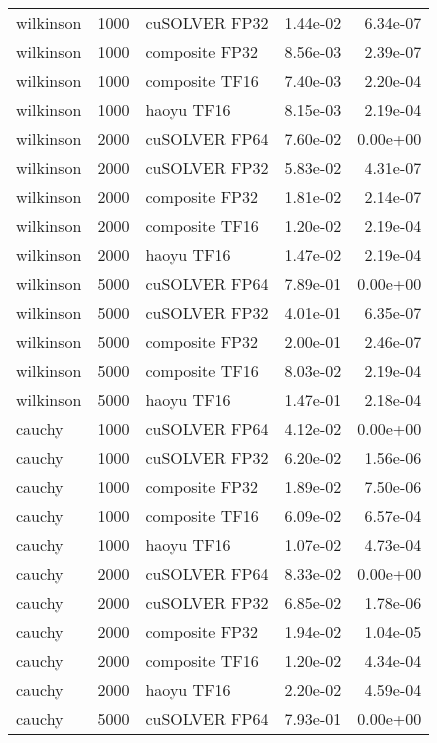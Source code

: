 \begin{table}
\begin{tabular}{lrlrr}
wilkinson &  1000 &  cuSOLVER FP32 &  1.44e-02 &        6.34e-07 \\
wilkinson &  1000 & composite FP32 &  8.56e-03 &        2.39e-07 \\
wilkinson &  1000 & composite TF16 &  7.40e-03 &        2.20e-04 \\
wilkinson &  1000 &     haoyu TF16 &  8.15e-03 &        2.19e-04 \\
wilkinson &  2000 &  cuSOLVER FP64 &  7.60e-02 &        0.00e+00 \\
wilkinson &  2000 &  cuSOLVER FP32 &  5.83e-02 &        4.31e-07 \\
wilkinson &  2000 & composite FP32 &  1.81e-02 &        2.14e-07 \\
wilkinson &  2000 & composite TF16 &  1.20e-02 &        2.19e-04 \\
wilkinson &  2000 &     haoyu TF16 &  1.47e-02 &        2.19e-04 \\
wilkinson &  5000 &  cuSOLVER FP64 &  7.89e-01 &        0.00e+00 \\
wilkinson &  5000 &  cuSOLVER FP32 &  4.01e-01 &        6.35e-07 \\
wilkinson &  5000 & composite FP32 &  2.00e-01 &        2.46e-07 \\
wilkinson &  5000 & composite TF16 &  8.03e-02 &        2.19e-04 \\
wilkinson &  5000 &     haoyu TF16 &  1.47e-01 &        2.18e-04 \\
   cauchy &  1000 &  cuSOLVER FP64 &  4.12e-02 &        0.00e+00 \\
   cauchy &  1000 &  cuSOLVER FP32 &  6.20e-02 &        1.56e-06 \\
   cauchy &  1000 & composite FP32 &  1.89e-02 &        7.50e-06 \\
   cauchy &  1000 & composite TF16 &  6.09e-02 &        6.57e-04 \\
   cauchy &  1000 &     haoyu TF16 &  1.07e-02 &        4.73e-04 \\
   cauchy &  2000 &  cuSOLVER FP64 &  8.33e-02 &        0.00e+00 \\
   cauchy &  2000 &  cuSOLVER FP32 &  6.85e-02 &        1.78e-06 \\
   cauchy &  2000 & composite FP32 &  1.94e-02 &        1.04e-05 \\
   cauchy &  2000 & composite TF16 &  1.20e-02 &        4.34e-04 \\
   cauchy &  2000 &     haoyu TF16 &  2.20e-02 &        4.59e-04 \\
   cauchy &  5000 &  cuSOLVER FP64 &  7.93e-01 &        0.00e+00 \\

\end{tabular}
\end{table}
